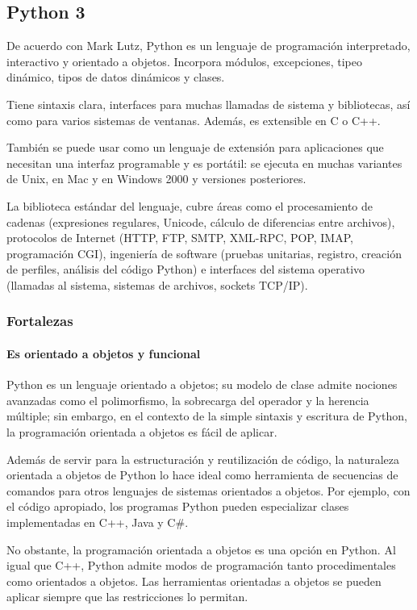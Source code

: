 \subsection*{Python 3}
De acuerdo con Mark Lutz\cite{lutz_learning_2013}, Python es un lenguaje de programación interpretado, interactivo y orientado a objetos. Incorpora módulos, excepciones, tipeo dinámico, tipos de datos dinámicos y clases.


Tiene sintaxis clara, interfaces para muchas llamadas de sistema y bibliotecas, así como para varios sistemas de ventanas. Además, es extensible en C o C++. 


También se puede usar como un lenguaje de extensión para aplicaciones que necesitan una interfaz programable y es portátil: se ejecuta en muchas variantes de Unix, en Mac y en Windows 2000 y versiones posteriores.


La biblioteca estándar del lenguaje, cubre áreas como el procesamiento de cadenas (expresiones regulares, Unicode, cálculo de diferencias entre archivos), protocolos de Internet (HTTP, FTP, SMTP, XML-RPC, POP, IMAP, programación CGI), ingeniería de software (pruebas unitarias, registro, creación de perfiles, análisis del código Python) e interfaces del sistema operativo (llamadas al sistema, sistemas de archivos, sockets TCP/IP).

\subsubsection*{Fortalezas}

\paragraph*{Es orientado a objetos y funcional}
Python es un lenguaje orientado a objetos; su modelo de clase admite nociones avanzadas como el polimorfismo, la sobrecarga del operador y la herencia múltiple; sin embargo, en el contexto de la simple sintaxis y escritura de Python, la programación orientada a objetos es fácil de aplicar.


Además de servir para la estructuración y reutilización de código, la naturaleza orientada a objetos de Python lo hace ideal como herramienta de secuencias de comandos para otros lenguajes de sistemas orientados a objetos. Por ejemplo, con el código apropiado, los programas Python pueden especializar clases implementadas en C++, Java y C\#.


No obstante, la programación orientada a objetos es una opción en Python. Al igual que C++, Python admite modos de programación tanto procedimentales como orientados a objetos. Las herramientas orientadas a objetos se pueden aplicar siempre que las restricciones lo permitan. 



